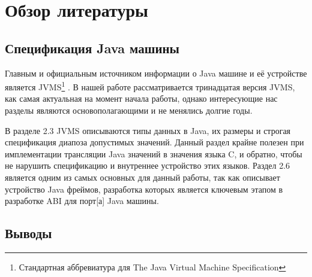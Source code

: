 \section*{Обзор литературы}

\subsection*{Спецификация Java машины}

Главным и официальным источником информации о Java машине и её устройстве является JVMS\footnote{Стандартная аббревиатура для The Java Virtual Machine Specification} \cite{jvms}. В нашей работе рассматривается тринадцатая версия JVMS, как самая актуальная на момент начала работы, однако интересующие нас разделы являются основополагающими и не менялись долгие годы.

В разделе 2.3 JVMS описываются типы данных в Java, их размеры и строгая спецификация диапоза допустимых значений. Данный раздел крайне полезен при имплементации трансляции Java значений в значения языка C, и обратно, чтобы не нарушить спецификацию и внутреннее устройство этих языков. Раздел 2.6 является одним из самых основных для данный работы, так как описывает устройство Java фреймов, разработка которых является ключевым этапом в разработке ABI для \gls{порт}[а] Java машины.   


\subsection*{Выводы}